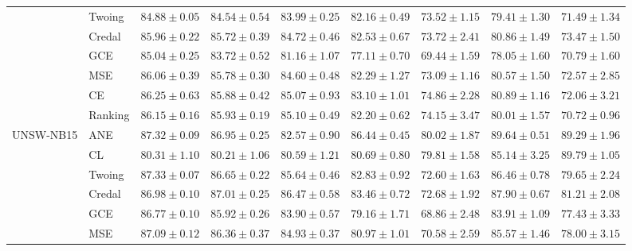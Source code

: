 \documentclass[letterpaper]{article} %
\begin{document}
\begin{table}[t]
\begin{tabular}{clccccccc}
 & Twoing & $84.88 \pm 0.05$ & $84.54 \pm 0.54$ & $83.99 \pm 0.25$ & $\mathbf{82.16 \pm 0.49}$ & $\mathbf{73.52 \pm 1.15}$ & $\mathbf{79.41 \pm 1.30}$ & $\mathbf{71.49 \pm 1.34}$ \\ 
 & Credal & $\mathbf{85.96 \pm 0.22}$ & $\mathbf{85.72 \pm 0.39}$ & $\mathbf{84.72 \pm 0.46}$ & $\mathbf{82.53 \pm 0.67}$ & $\mathbf{73.72 \pm 2.41}$ & $\mathbf{80.86 \pm 1.49}$ & $\mathbf{73.47 \pm 1.50}$ \\ 
 & GCE    & $85.04 \pm 0.25$ & $83.72 \pm 0.52$ & $81.16 \pm 1.07$ & $77.11 \pm 0.70$ & $69.44 \pm 1.59$ & $78.05 \pm 1.60$ & $70.79 \pm 1.60$ \\ 
 & MSE    & $\mathbf{86.06 \pm 0.39}$ & $\mathbf{85.78 \pm 0.30}$ & $\mathbf{84.60 \pm 0.48}$ & $\mathbf{82.29 \pm 1.27}$ & $\mathbf{73.09 \pm 1.16}$ & $\mathbf{80.57 \pm 1.50}$ & $\mathbf{72.57 \pm 2.85}$ \\ 
 & CE     & $\mathbf{86.25 \pm 0.63}$ & $\mathbf{85.88 \pm 0.42}$ & $\mathbf{85.07 \pm 0.93}$ & $\mathbf{83.10 \pm 1.01}$ & $\mathbf{74.86 \pm 2.28}$ & $\mathbf{80.89 \pm 1.16}$ & $\mathbf{72.06 \pm 3.21}$ \\ 
 & Ranking & $\mathbf{86.15 \pm 0.16}$ & $\mathbf{85.93 \pm 0.19}$ & $\mathbf{85.10 \pm 0.49}$ & $\mathbf{82.20 \pm 0.62}$ & $\mathbf{74.15 \pm 3.47}$ & $\mathbf{80.01 \pm 1.57}$ & $70.72 \pm 0.96$ \\ 
\hline
\multirow{8}{*}{UNSW-NB15}
 & ANE    & $\mathbf{87.32 \pm 0.09}$ & $\mathbf{86.95 \pm 0.25}$ & $82.57 \pm 0.90$ & $\mathbf{86.44 \pm 0.45}$ & $\mathbf{80.02 \pm 1.87}$ & $\mathbf{89.64 \pm 0.51}$ & $\mathbf{89.29 \pm 1.96}$ \\ 
 & CL     & $80.31 \pm 1.10$ & $80.21 \pm 1.06$ & $80.59 \pm 1.21$ & $80.69 \pm 0.80$ & $\mathbf{79.81 \pm 1.58}$ & $85.14 \pm 3.25$ & $\mathbf{89.79 \pm 1.05}$ \\ 
 & Twoing & $\mathbf{87.33 \pm 0.07}$ & $\mathbf{86.65 \pm 0.22}$ & $85.64 \pm 0.46$ & $82.83 \pm 0.92$ & $72.60 \pm 1.63$ & $86.46 \pm 0.78$ & $79.65 \pm 2.24$ \\ 
 & Credal & $86.98 \pm 0.10$ & $\mathbf{87.01 \pm 0.25}$ & $\mathbf{86.47 \pm 0.58}$ & $83.46 \pm 0.72$ & $72.68 \pm 1.92$ & $87.90 \pm 0.67$ & $81.21 \pm 2.08$ \\ 
 & GCE    & $86.77 \pm 0.10$ & $85.92 \pm 0.26$ & $83.90 \pm 0.57$ & $79.16 \pm 1.71$ & $68.86 \pm 2.48$ & $83.91 \pm 1.09$ & $77.43 \pm 3.33$ \\ 
 & MSE    & $87.09 \pm 0.12$ & $86.36 \pm 0.37$ & $84.93 \pm 0.37$ & $80.97 \pm 1.01$ & $70.58 \pm 2.59$ & $85.57 \pm 1.46$ & $78.00 \pm 3.15$ \\ 

\end{tabular}
\end{table}
\end{document}
